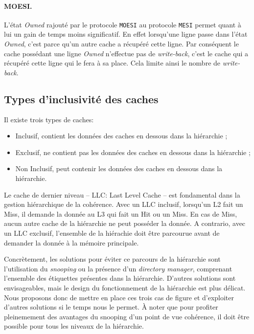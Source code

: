\paragraph{MOESI.} L'état \emph{Owned} rajouté par le protocole \texttt{MOESI} au protocole \texttt{MESI} permet quant à lui un gain de temps moins significatif. En effet lorsqu'une ligne passe dans l'état \emph{Owned}, c'est parce qu'un autre cache a récupéré cette ligne. Par conséquent le cache possédant une ligne \emph{Owned} n'effectue pas de \emph{write-back}, c'est le cache qui a récupéré cette ligne qui le fera à sa place. Cela limite ainsi le nombre de \emph{write-back}.

\subsection{Types d'inclusivité des caches}
\label{global}

Il existe trois types de caches:
\begin{itemize}
\item Inclusif, contient les données des caches en dessous dans la hiérarchie ;
\item Exclusif, ne contient pas les données des caches en dessous dans la hiérarchie ;
\item Non Inclusif, peut contenir les données des caches en dessous dans la hiérarchie.\\
\end{itemize}

Le cache de dernier niveau -- LLC: Last Level Cache -- est fondamental dans la gestion hiérarchique de la cohérence. Avec un LLC inclusif, lorsqu'un L2 fait un Miss, il demande la donnée au L3 qui fait un Hit ou un Miss. En cas de Miss, aucun autre cache de la hiérarchie ne peut posséder la donnée. A contrario, avec un LLC exclusif, l'ensemble de la hiérachie doit être parcourue avant de demander la donnée à la mémoire principale.


Concrètement, les solutions pour éviter ce parcours de la hiérarchie sont l'utilisation du \emph{snooping} ou la présence d'un \emph{directory manager}, comprenant l'ensemble des étiquettes présentes dans la hiérarchie. D'autres solutions sont envisageables, mais le design du fonctionnement de la hiérarchie est plus délicat. Nous proposons donc de mettre en place ces trois cas de figure et d'exploiter d'autres solutions si le temps nous le permet. \`A noter que pour profiter pleinemement des avantages du snooping d'un point de vue cohérence, il doit être possible pour tous les niveaux de la hiérarchie.
